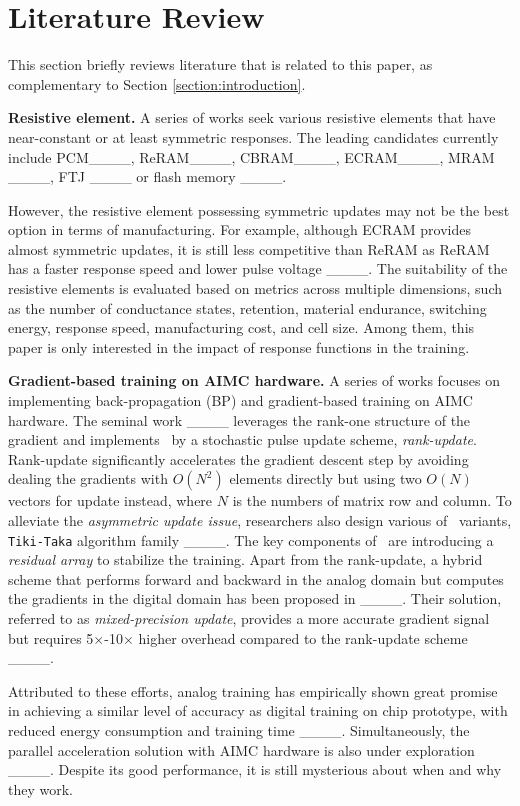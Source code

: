 \section{Literature Review}
\label{section:review}
This section briefly reviews literature that is related to this paper, as complementary to Section \ref{section:introduction}.

\textbf{Resistive element.}
A series of works seek various resistive elements that have near-constant or at least symmetric responses.
The leading candidates currently include {PCM}____, {ReRAM}____, 
{CBRAM}____, {ECRAM}____, MRAM ____, FTJ ____ or flash memory ____. 

However, the resistive element possessing symmetric updates may not be the best option in terms of manufacturing. 
For example, although ECRAM provides almost symmetric updates, it is still less competitive than ReRAM as ReRAM has a faster response speed and lower pulse voltage ____.
The suitability of the resistive elements is evaluated based on metrics across multiple dimensions, such as the number of conductance states, retention, material endurance, switching energy, response speed, manufacturing cost, and cell size. 
Among them, this paper is only interested in the impact of response functions in the training.

\textbf{Gradient-based training on AIMC hardware.} A series of works focuses on implementing back-propagation (BP) and gradient-based training on AIMC hardware.
The seminal work ____ leverages the rank-one structure of the gradient and implements \AnalogSGD~by a stochastic pulse update scheme, \emph{rank-update}. Rank-update significantly accelerates the gradient descent step by avoiding dealing the gradients with $O(N^2)$ elements directly but using two $O(N)$ vectors for update instead, where $N$ is the numbers of matrix row and column.
To alleviate the {\em asymmetric update issue}, researchers also design various of \AnalogSGD~variants, \texttt{Tiki-Taka} algorithm family ____. The key components of \TT~are introducing a \emph{residual array} to stabilize the training.
Apart from the rank-update, a hybrid scheme that performs forward and backward in the analog domain but computes the gradients in the digital domain has been proposed in ____. Their solution, referred to as \emph{mixed-precision update}, provides a more accurate gradient signal but requires 5$\times$-10$\times$ higher overhead compared to the rank-update scheme ____.

Attributed to these efforts, analog training has empirically shown great promise in achieving a similar level of accuracy as digital training on chip prototype, with reduced energy consumption and training time ____.
Simultaneously, the parallel acceleration solution with AIMC hardware is also under exploration ____.
Despite its good performance, it is still mysterious about when and why they work.


